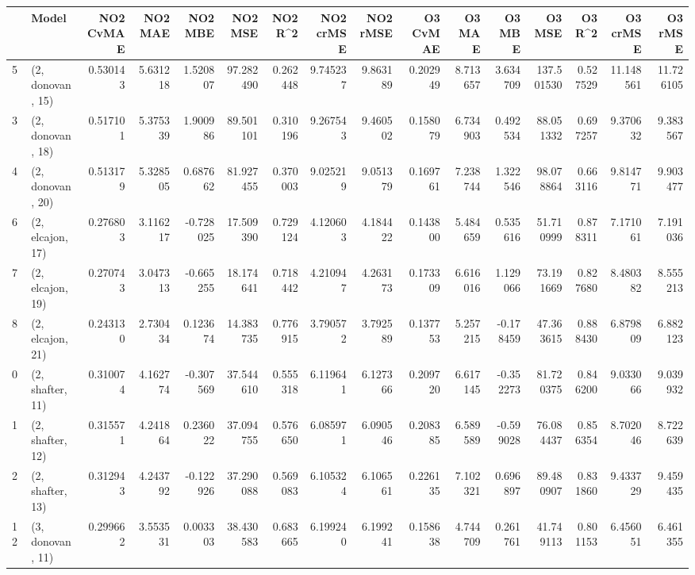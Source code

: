 \begin{tabular}{llrrrrrrrrrrrrrr}
\toprule
{} &             Model &  NO2 CvMAE &   NO2 MAE &   NO2 MBE &    NO2 MSE &   NO2 R\textasciicircum2 &  NO2 crMSE &  NO2 rMSE &  O3 CvMAE &     O3 MAE &    O3 MBE &      O3 MSE &    O3 R\textasciicircum2 &   O3 crMSE &    O3 rMSE \\
\midrule
5  &  (2, donovan, 15) &   0.530143 &  5.631218 &  1.520807 &  97.282490 &  0.262448 &   9.745237 &  9.863189 &  0.202949 &   8.713657 &  3.634709 &  137.501530 &  0.527529 &  11.148561 &  11.726105 \\
3  &  (2, donovan, 18) &   0.517101 &  5.375339 &  1.900986 &  89.501101 &  0.310196 &   9.267543 &  9.460502 &  0.158079 &   6.734903 &  0.492534 &   88.051332 &  0.697257 &   9.370632 &   9.383567 \\
4  &  (2, donovan, 20) &   0.513179 &  5.328505 &  0.687662 &  81.927455 &  0.370003 &   9.025219 &  9.051379 &  0.169761 &   7.238744 &  1.322546 &   98.078864 &  0.663116 &   9.814771 &   9.903477 \\
6  &  (2, elcajon, 17) &   0.276803 &  3.116217 & -0.728025 &  17.509390 &  0.729124 &   4.120603 &  4.184422 &  0.143800 &   5.484659 &  0.535616 &   51.710999 &  0.878311 &   7.171061 &   7.191036 \\
7  &  (2, elcajon, 19) &   0.270743 &  3.047313 & -0.665255 &  18.174641 &  0.718442 &   4.210947 &  4.263173 &  0.173309 &   6.616016 &  1.129066 &   73.191669 &  0.827680 &   8.480382 &   8.555213 \\
8  &  (2, elcajon, 21) &   0.243130 &  2.730434 &  0.123674 &  14.383735 &  0.776915 &   3.790572 &  3.792589 &  0.137753 &   5.257215 & -0.178459 &   47.363615 &  0.888430 &   6.879809 &   6.882123 \\
0  &  (2, shafter, 11) &   0.310074 &  4.162774 & -0.307569 &  37.544610 &  0.555318 &   6.119641 &  6.127366 &  0.209720 &   6.617145 & -0.352273 &   81.720375 &  0.846200 &   9.033066 &   9.039932 \\
1  &  (2, shafter, 12) &   0.315571 &  4.241864 &  0.236022 &  37.094755 &  0.576650 &   6.085971 &  6.090546 &  0.208385 &   6.589589 & -0.599028 &   76.084437 &  0.856354 &   8.702046 &   8.722639 \\
2  &  (2, shafter, 13) &   0.312943 &  4.243792 & -0.122926 &  37.290088 &  0.569083 &   6.105324 &  6.106561 &  0.226135 &   7.102321 &  0.696897 &   89.480907 &  0.831860 &   9.433729 &   9.459435 \\
12 &  (3, donovan, 11) &   0.299662 &  3.553531 &  0.003303 &  38.430583 &  0.683665 &   6.199240 &  6.199241 &  0.158638 &   4.744709 &  0.261761 &   41.749113 &  0.801153 &   6.456051 &   6.461355 \\

\end{tabular}
